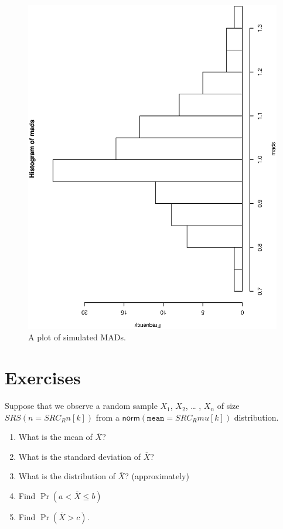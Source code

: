 \documentclass[captions=tableheading]{scrbook}
\begin{document}
\begin{figure}[th]
  \includegraphics[angle=270, totalheight=4in]{ps/sampdist/simulated-MAD.ps}
  \caption[Plot of simulated MADs]{\small A plot of simulated MADs.}
  \label{fig-simulated-MAD}
\end{figure}


\newpage{}
\section{Exercises}
\label{sec-8-6}

\setcounter{thm}{0}



\begin{xca}
Suppose that we observe a random sample \(X_{1}\), \(X_{2}\), \ldots{} , \(X_{n}\) of size \( SRS( n =  SRC_R{n[k]} ) \) from a \( \mathsf{norm}(\mathtt{mean}= SRC_R{mu[k]}) \) distribution. 
\begin{enumerate}
\item What is the mean of \(\overline{X}\)?
\item What is the standard deviation of \(\overline{X}\)?
\item What is the distribution of \(\overline{X}\)? (approximately)
\item Find \(\Pr(a< \overline{X} \leq b)\)
\item Find \(\Pr(\overline{X} > c)\).
\end{enumerate}

\end{xca}
\end{document}
